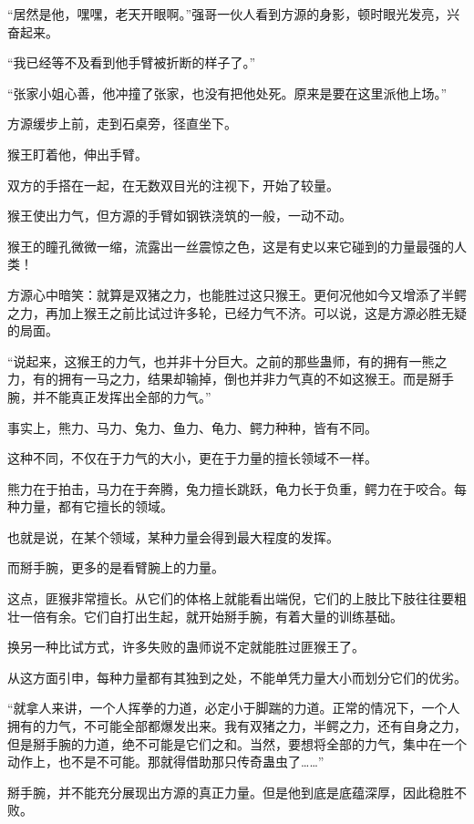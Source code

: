 
\begin{this_body}

“居然是他，嘿嘿，老天开眼啊。”强哥一伙人看到方源的身影，顿时眼光发亮，兴奋起来。

“我已经等不及看到他手臂被折断的样子了。”

“张家小姐心善，他冲撞了张家，也没有把他处死。原来是要在这里派他上场。”

方源缓步上前，走到石桌旁，径直坐下。

猴王盯着他，伸出手臂。

双方的手搭在一起，在无数双目光的注视下，开始了较量。

猴王使出力气，但方源的手臂如钢铁浇筑的一般，一动不动。

猴王的瞳孔微微一缩，流露出一丝震惊之色，这是有史以来它碰到的力量最强的人类！

方源心中暗笑：就算是双猪之力，也能胜过这只猴王。更何况他如今又增添了半鳄之力，再加上猴王之前比试过许多轮，已经力气不济。可以说，这是方源必胜无疑的局面。

“说起来，这猴王的力气，也并非十分巨大。之前的那些蛊师，有的拥有一熊之力，有的拥有一马之力，结果却输掉，倒也并非力气真的不如这猴王。而是掰手腕，并不能真正发挥出全部的力气。”

事实上，熊力、马力、兔力、鱼力、龟力、鳄力种种，皆有不同。

这种不同，不仅在于力气的大小，更在于力量的擅长领域不一样。

熊力在于拍击，马力在于奔腾，兔力擅长跳跃，龟力长于负重，鳄力在于咬合。每种力量，都有它擅长的领域。

也就是说，在某个领域，某种力量会得到最大程度的发挥。

而掰手腕，更多的是看臂腕上的力量。

这点，匪猴非常擅长。从它们的体格上就能看出端倪，它们的上肢比下肢往往要粗壮一倍有余。它们自打出生起，就开始掰手腕，有着大量的训练基础。

换另一种比试方式，许多失败的蛊师说不定就能胜过匪猴王了。

从这方面引申，每种力量都有其独到之处，不能单凭力量大小而划分它们的优劣。

“就拿人来讲，一个人挥拳的力道，必定小于脚踹的力道。正常的情况下，一个人拥有的力气，不可能全部都爆发出来。我有双猪之力，半鳄之力，还有自身之力，但是掰手腕的力道，绝不可能是它们之和。当然，要想将全部的力气，集中在一个动作上，也不是不可能。那就得借助那只传奇蛊虫了……”

掰手腕，并不能充分展现出方源的真正力量。但是他到底是底蕴深厚，因此稳胜不败。


\end{this_body}
